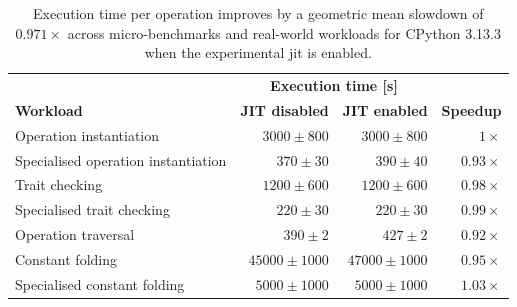 \begin{table}[H]
  \caption{Execution time per operation improves by a geometric mean slowdown of $0.971\times$ across micro-benchmarks and real-world workloads for CPython 3.13.3 when the experimental \ac{jit} is enabled.}
  \label{tab:experimental-jit-compiler-xdsl}
  \centering
  \begin{tabular}{lrrr}
    \toprule
    & \multicolumn{2}{c}{\textbf{Execution time [s]}} \\
    \cmidrule(r){2-3}
    \textbf{Workload}& \textbf{JIT disabled} & \textbf{JIT enabled} & \textbf{Speedup} \\
    \midrule
    Operation instantiation & $3000 \pm 800$ & $3000 \pm 800$ & $1\times$ \\
    Specialised operation instantiation & $370 \pm 30$ & $390 \pm 40$ & $0.93\times$ \\
    Trait checking & $1200 \pm 600$ & $1200 \pm 600$ & $0.98\times$ \\
    Specialised trait checking & $220 \pm 30$ & $220 \pm 30$ & $0.99\times$ \\
    Operation traversal & $390 \pm 2$ & $427 \pm 2$ & $0.92\times$ \\ %
    Constant folding & $45000 \pm 1000$ & $47000 \pm 1000$ & $0.95\times$ \\
    Specialised constant folding & $5000 \pm 1000$ & $5000 \pm 1000$ & $1.03\times$ \\
    \bottomrule
  \end{tabular}
\end{table}

